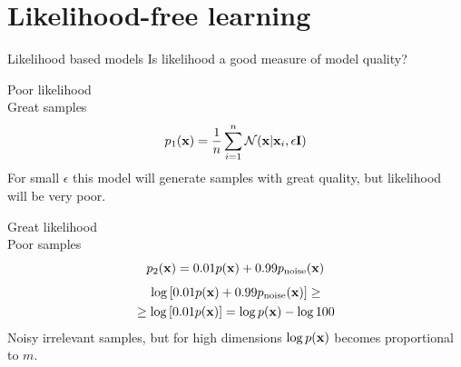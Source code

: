 \section{Likelihood-free learning}
\begin{frame}{Likelihood based models}
	Is likelihood a good measure of model quality?
	\begin{minipage}[t]{0.48\columnwidth}
		\begin{block}{Poor likelihood \\ Great samples}
			\vspace{-0.3cm}
			\[
				p_1(\mathbf{x}) = \frac{1}{n} \sum_{i=1}^n \mathcal{N}(\mathbf{x} | \mathbf{x}_i, \epsilon \mathbf{I})
			\]
			For small $\epsilon$ this model will generate samples with great quality, but likelihood will be very poor.
		\end{block}
	\end{minipage}%
	\begin{minipage}[t]{0.52\columnwidth}
		\begin{block}{Great likelihood \\ Poor samples}
			\vspace{-0.3cm}
			\[
				p_2(\mathbf{x}) = 0.01p(\mathbf{x}) + 0.99p_{\text{noise}}(\mathbf{x})
			\]
			\begin{multline*}
				\log \left[ 0.01p(\mathbf{x}) + 0.99p_{\text{noise}}(\mathbf{x}) \right] \geq  \\ \geq \log \left[ 0.01p(\mathbf{x}) \right]  = \log p(\mathbf{x}) - \log 100
			\end{multline*}
		Noisy irrelevant samples, but for high dimensions $\log p(\mathbf{x})$ becomes proportional to $m$.
		\end{block}
	\end{minipage}
\end{frame}
